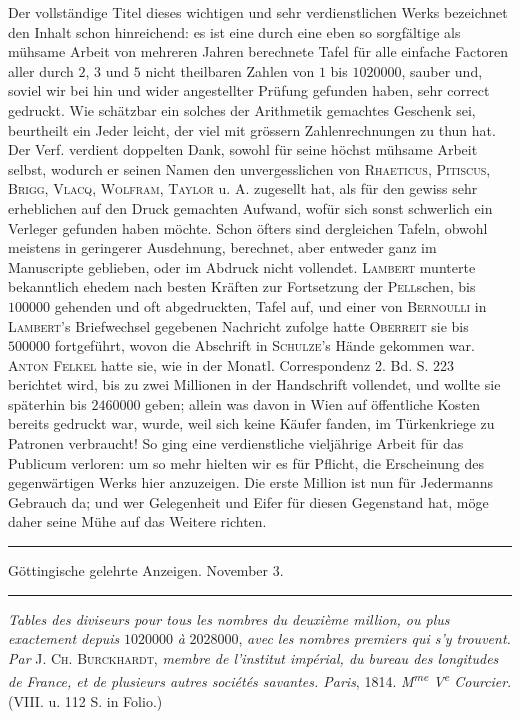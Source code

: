 Der vollständige Titel dieses wichtigen und sehr verdienstlichen Werks bezeichnet den Inhalt schon hinreichend: es ist eine durch eine eben so sorgfältige als mühsame Arbeit von mehreren Jahren berechnete Tafel für alle einfache Factoren aller durch $2$, $3$ und $5$ nicht theilbaren Zahlen von $1$ bis $1020000$, sauber und, soviel wir bei hin und wider angestellter Prüfung gefunden haben, sehr correct gedruckt. Wie schätzbar ein solches der Arithmetik gemachtes Geschenk sei, beurtheilt ein Jeder leicht, der viel mit grössern Zahlenrechnungen zu thun hat. Der Verf. verdient doppelten Dank, sowohl für seine höchst mühsame Arbeit selbst, wodurch er seinen Namen den unvergesslichen von \textsc{Rhaeticus}, \textsc{Pitiscus}, \textsc{Brigg}, \textsc{Vlacq}, \textsc{Wolfram}, \textsc{Taylor} u. A. zugesellt hat, als für den gewiss sehr erheblichen auf den Druck gemachten Aufwand, wofür sich sonst schwerlich ein Verleger gefunden haben möchte. Schon öfters sind dergleichen Tafeln, obwohl meistens in geringerer Ausdehnung, berechnet, aber entweder ganz im Manuscripte geblieben, oder im Abdruck nicht vollendet. \textsc{Lambert} munterte bekanntlich ehedem nach besten Kräften zur Fortsetzung der \textsc{Pell}schen, bis $100000$ gehenden und oft abgedruckten, Tafel auf, und einer von \textsc{Bernoulli} in \textsc{Lambert}'s Briefwechsel gegebenen Nachricht zufolge hatte \textsc{Oberreit} sie bis $500000$ fortgeführt, wovon die Abschrift in \textsc{Schulze}'s Hände gekommen war. \textsc{Anton Felkel} hatte sie, wie in der Monatl. Correspondenz 2. Bd. S. 223 berichtet wird, bis zu zwei Millionen in der Handschrift vollendet, und wollte sie späterhin bis $2460000$ geben; allein was davon in Wien auf öffentliche Kosten bereits gedruckt war, wurde, weil sich keine Käufer fanden, im Türkenkriege zu Patronen verbraucht! So ging eine verdienstliche vieljährige Arbeit für das Publicum verloren: um so mehr hielten wir es für Pflicht, die Erscheinung des gegenwärtigen Werks hier anzuzeigen. Die erste Million ist nun für Jedermanns Gebrauch da; und wer Gelegenheit und Eifer für diesen Gegenstand hat, möge daher seine Mühe auf das Weitere richten.

\begin{center}
\rule{.86\linewidth}{.3pt}\par
Göttingische gelehrte Anzeigen. November 3.\par
\rule{.86\linewidth}{.3pt}
\end{center}
\emph{Tables des diviseurs pour tous les nombres du deuxième million, ou plus exactement depuis} $1020000$ \emph{à} $2028000$, \emph{avec les nombres premiers qui s'y trouvent. Par} \textsc{J. Ch. Burckhardt}, \emph{membre de l'institut impérial, du bureau des longitudes de France, et de plusieurs autres sociétés savantes. Paris}, 1814. \emph{M\textsuperscript{me} V\textsuperscript{e} Courcier}. (VIII. u. 112 S. in Folio.)

